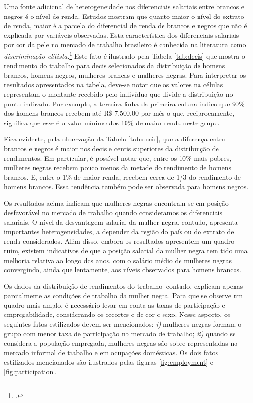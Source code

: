 \documentclass[12pt]{article}
\begin{document}
\par Uma fonte adicional de heterogeneidade nos diferenciais salariais entre brancos e negros é o nível de renda. Estudos mostram que quanto maior o nível do extrato de renda, maior é a parcela do diferencial de renda de brancos e negros que não é explicada por variáveis observadas. Esta característica dos diferenciais salariais por cor da pele no mercado de trabalho brasileiro é conhecida na literatura como \textit{discriminação elitista}.\footcite{soares2000perfil,campante2004desigualdade} Este fato é ilustrado pela Tabela \ref{tab:decis} que mostra o rendimento do trabalho para decis selecionados da distribuição de homens brancos, homens negros, mulheres brancas e mulheres negras. Para interpretar os resultados apresentados na tabela, deve-se notar que os valores na células representam o montante recebido pelo indivíduo que divide a distribuição no ponto indicado. Por exemplo, a terceira linha da primeira coluna indica que 90\% dos homens brancos recebem até R\$ 7.500,00 por mês o que, reciprocamente, significa que esse é o valor mínimo dos 10\% de maior renda neste grupo.



\par Fica evidente, pela observação da Tabela \ref{tab:decis}, que a diferença entre brancos e negros é maior nos decis e centis superiores da distribuição de rendimentos. Em particular, é possível notar que, entre os 10\% mais pobres, mulheres negras recebem pouco menos da metade do rendimento de homens brancos. E, entre o 1\% de maior renda, recebem cerca de 1/3 do rendimento de homens brancos. Essa tendência também pode ser observada para homens negros.

\par Os resultados acima indicam que mulheres negras encontram-se em posição desfavorável no mercado de trabalho quando consideramos os diferenciais salariais. O nível da desvantagem salarial da mulher negra, contudo, apresenta importantes heterogeneidades, a depender da região do país ou do extrato de renda considerados. Além disso, embora os resultados apresentem um quadro ruim, existem indicativos de que a posição salarial da mulher negra tem tido uma melhoria relativa ao longo dos anos, com o salário médio de mulheres negras convergindo, ainda que lentamente, aos níveis observados para homens brancos. 

\par Os dados da distribuição de rendimentos do trabalho, contudo, explicam apenas parcialmente as condições de trabalho da mulher negra. Para que se observe um quadro mais amplo, é necessário levar em conta as taxas de participação e empregabilidade, considerando os recortes e de cor e sexo. Nesse aspecto, os seguintes fatos estilizados devem ser mencionados: \textit{i)} mulheres negras formam o grupo com menor taxa de participação no mercado de trabalho; \textit{ii)} quando se considera a população empregada, mulheres negras são sobre-representadas no mercado informal de trabalho e em ocupações domésticas. Os dois fatos estilizados mencionados são ilustrados pelas figuras \ref{fig:employment} e \ref{fig:participation}.
\end{document}

